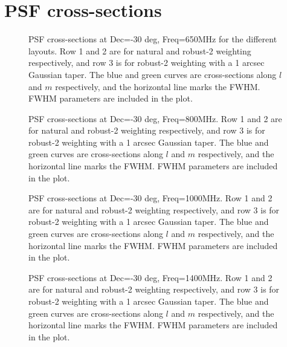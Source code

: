 \documentclass[sfheadings,a4paper,times,9pt,floats,floatfix]{article}
\begin{document}
\section{PSF cross-sections}\label{app:psf}
\begin{figure}[H]
 \tiny{}
 \caption{PSF cross-sections at Dec=-30 deg, Freq=650MHz for the different layouts. Row 1 and 2 are for natural and
robust-2
weighting respectively, and row
3 is for robust-2 weighting with a 1 arcsec Gaussian taper. The blue and green curves are cross-sections along $l$ and $m$
respectively, and the horizontal line marks the FWHM. FWHM parameters are included in the plot.}
\end{figure}
\begin{figure}[H]
 \tiny{}
 \caption{PSF cross-sections at Dec=-30 deg, Freq=800MHz. Row 1 and 2 are for natural and robust-2 weighting
respectively, and 
row
3 is for robust-2 weighting with a 1 arcsec Gaussian taper. The blue and green curves are cross-sections along $l$ and $m$
respectively, and the horizontal line marks the FWHM. FWHM parameters are included in the plot.}
\end{figure}
\begin{figure}[H]
 \tiny{}
 \caption{PSF cross-sections at Dec=-30 deg, Freq=1000MHz. Row 1 and 2 are for natural and robust-2 weighting
respectively, and
row
3 is for robust-2 weighting with a 1 arcsec Gaussian taper. The blue and green curves are cross-sections along $l$ and $m$
respectively, and the horizontal line marks the FWHM. FWHM parameters are included in the plot.}
\end{figure}
\begin{figure}[H]
 \tiny{}
 \caption{PSF cross-sections at Dec=-30 deg, Freq=1400MHz. Row 1 and 2 are for natural and robust-2 weighting
respectively, and row 3 is for robust-2 weighting with a 1 arcsec Gaussian taper. The blue and green curves are
cross-sections along $l$ and $m$ respectively, and the horizontal line marks the FWHM. FWHM parameters are included in
the plot.}
\end{figure}
\end{document}
